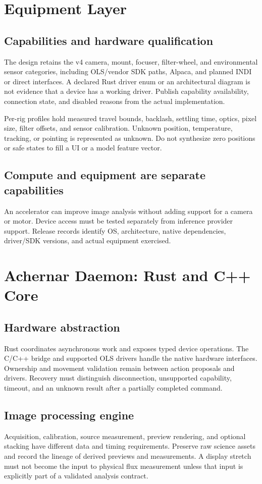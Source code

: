\documentclass[11pt,a4paper]{article}
\begin{document}
\section{Equipment Layer}
\subsection{Capabilities and hardware qualification}
The design retains the v4 camera, mount, focuser, filter-wheel, and environmental
sensor categories, including OLS/vendor SDK paths, Alpaca, and planned INDI or
direct interfaces. A declared Rust driver enum or an architectural diagram is
not evidence that a device has a working driver. Publish capability availability,
connection state, and disabled reasons from the actual implementation.

Per-rig profiles hold measured travel bounds, backlash, settling time, optics,
pixel size, filter offsets, and sensor calibration. Unknown position,
temperature, tracking, or pointing is represented as unknown. Do not synthesize
zero positions or safe states to fill a UI or a model feature vector.

\subsection{Compute and equipment are separate capabilities}
An accelerator can improve image analysis without adding support for a camera
or motor. Device access must be tested separately from inference provider
support. Release records identify OS, architecture, native dependencies,
driver/SDK versions, and actual equipment exercised.

\section{Achernar Daemon: Rust and C++ Core}
\subsection{Hardware abstraction}
Rust coordinates asynchronous work and exposes typed device operations. The
C/C++ bridge and supported OLS drivers handle the native hardware interfaces.
Ownership and movement validation remain between action proposals and drivers.
Recovery must distinguish disconnection, unsupported capability, timeout, and
an unknown result after a partially completed command.

\subsection{Image processing engine}
Acquisition, calibration, source measurement, preview rendering, and optional
stacking have different data and timing requirements. Preserve raw science
assets and record the lineage of derived previews and measurements. A
display stretch must not become the input to physical flux measurement unless
that input is explicitly part of a validated analysis contract.
\end{document}
